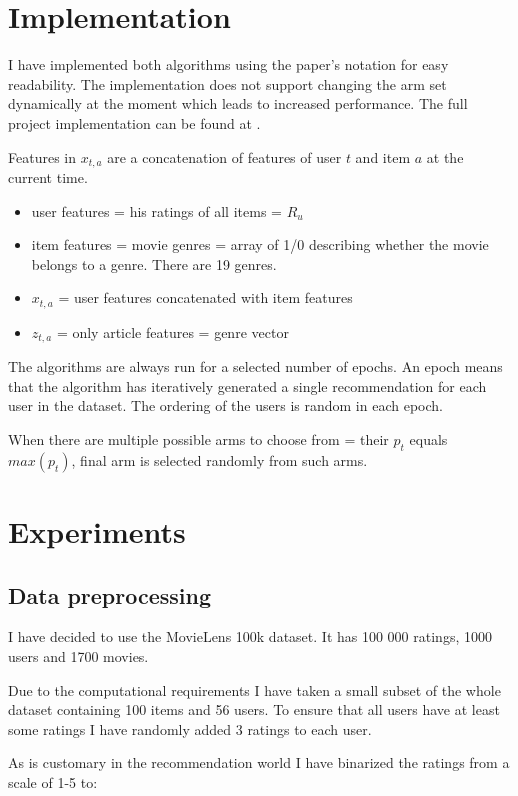 \documentclass[12pt, titlepage]{article}
\begin{document}
\section{Implementation}\label{sec:impl}
I have implemented both algorithms using the paper's notation for easy readability. The implementation does not support changing the arm set dynamically at the moment which leads to increased performance. The full project implementation can be found at \cite{cit:impl}.

Features in $x_{t,a}$ are a concatenation of features of user $t$ and item $a$ at the current time.

\begin{itemize}
\item user features = his ratings of all items = $R_u$
\item item features = movie genres = array of 1/0 describing whether the movie belongs to a genre. There are 19 genres.
\item $x_{t,a}$ = user features concatenated with item features
\item $z_{t,a}$ = only article features = genre vector
\end{itemize}

The algorithms are always run for a selected number of epochs.
An epoch means that the algorithm has iteratively generated a single recommendation for each user in the dataset. The ordering of the users is random in each epoch.

When there are multiple possible arms to choose from = their $p_t$ equals $max(p_t)$, final arm is selected randomly from such arms. 


\section{Experiments}\label{sec:exp}

\subsection{Data preprocessing}
I have decided to use the MovieLens 100k dataset. 
It has 100 000 ratings, 1000 users and 1700 movies. \cite{cit:ml}

Due to the computational requirements I have taken a small subset of the whole dataset containing 100 items and 56 users. To ensure that all users have at least some ratings I have randomly added 3 ratings to each user.

As is customary in the recommendation world I have binarized the ratings from a scale of 1-5 to:
\end{document}
